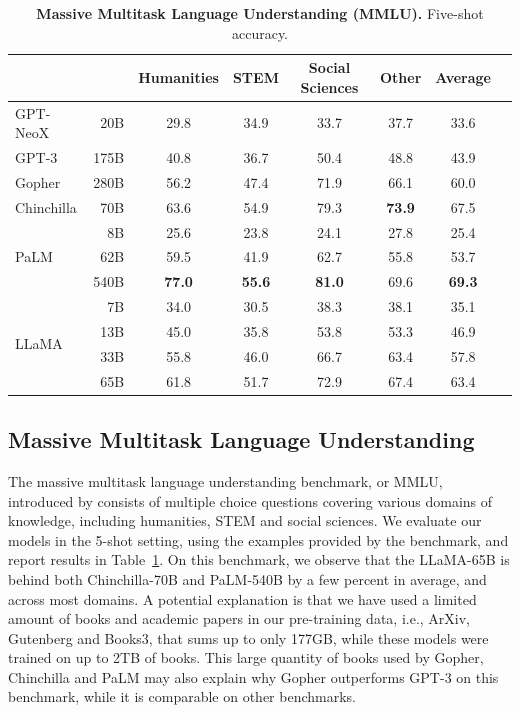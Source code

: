 \documentclass[11pt]{article}
\newcommand{\tbf}{\textbf}
\newcommand{\model}{LLaMA\xspace}
\begin{document}
\begin{table}[t!]
    \center
    \begin{tabular}{lrcccccc}
        \toprule
         &  & Humanities & STEM & Social Sciences & Other & Average\\
        \midrule
        GPT-NeoX   & 20B   & 29.8 & 34.9 & 33.7 & 37.7 & 33.6 \\
        GPT-3      & 175B  & 40.8 & 36.7 & 50.4 & 48.8 & 43.9 \\
        Gopher     & 280B  & 56.2 & 47.4 & 71.9 & 66.1 & 60.0 \\
        Chinchilla & 70B   & 63.6 & 54.9 & 79.3 & \tbf{73.9} & 67.5\\
        \midrule
        \multirow{3}{*}{PaLM}
                   & 8B       & 25.6 & 23.8 & 24.1 & 27.8 & 25.4 \\
                   & 62B      & 59.5 & 41.9 & 62.7 & 55.8 & 53.7 \\
                   & 540B     & \tbf{77.0} & \tbf{55.6} & \tbf{81.0} & 69.6 & \tbf{69.3} \\
        \midrule
        \multirow{4}{*}{\model}
                   & 7B & 34.0 & 30.5 & 38.3 & 38.1 & 35.1 \\
                   & 13B  & 45.0 & 35.8 & 53.8 & 53.3 & 46.9 \\
                   & 33B  & 55.8 & 46.0 & 66.7 & 63.4 & 57.8 \\
                   & 65B  & 61.8 & 51.7 & 72.9 & 67.4 & 63.4  \\
        \bottomrule
    \end{tabular}
    \caption{
    \textbf{Massive Multitask Language Understanding (MMLU).} Five-shot accuracy.
    \label{tab:mmlu}
    }
\end{table}
\subsection{Massive Multitask Language Understanding}
The massive multitask language understanding benchmark, or MMLU, introduced by \citet{hendrycks2020measuring} consists of multiple choice questions covering various domains of knowledge, including humanities, STEM and social sciences. 
We evaluate our models in the 5-shot setting, using the examples provided by the benchmark, and report results in Table~\ref{tab:mmlu}.
On this benchmark, we observe that the \model-65B is behind both Chinchilla-70B and PaLM-540B by a few percent in average, and across most domains.
A potential explanation is that we have used a limited amount of books and academic papers in our pre-training data, i.e., ArXiv, Gutenberg and Books3, that sums up to only 177GB, while these models were trained on up to 2TB of books.
This large quantity of books used by Gopher, Chinchilla and PaLM may also explain why Gopher outperforms GPT-3 on this benchmark, while it is comparable on other benchmarks.
\end{document}
